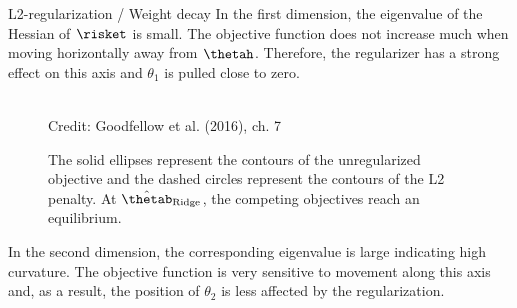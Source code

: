 \begin{vbframe}{L2-regularization / Weight decay}
   In the first dimension, the eigenvalue of the Hessian of $\risket$ is small. The objective function does not increase much when moving horizontally away from $\thetah$. Therefore, the regularizer has a strong effect on this axis and $\theta_1$ is pulled close to zero.
    
    \framebreak
    
    \begin{figure}
    \centering
      \tiny{\\ Credit: Goodfellow et al. (2016), ch. 7}
      \caption{\footnotesize The solid ellipses represent the contours of the unregularized objective and the dashed circles represent the contours of the L2 penalty. At $\hat{\thetab}_{\text{Ridge}}$, the competing objectives reach an equilibrium.}
  \end{figure}
  
    In the second dimension, the corresponding eigenvalue is large indicating high curvature. The objective function is very sensitive to movement along this axis and, as a result, the position of $\theta_2$ is less affected by the regularization.
  
\end{vbframe}

